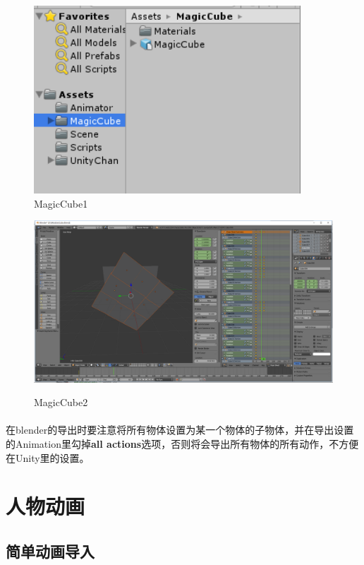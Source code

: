 \documentclass{article}
\begin{document}
\begin{figure}[H]
  \centering
  \includegraphics[width=10cm]{assets2.png}\\
  \caption{MagicCube1}\label{1-2}
  \includegraphics[width=36em]{blender1.png}\\
  \caption{MagicCube2}\label{1-3}
\end{figure}
\paragraph{}
在blender的导出时要注意将所有物体设置为某一个物体的子物体，并在导出设置的Animation里勾掉\textbf{all actions}选项，否则将会导出所有物体的所有动作，不方便在Unity里的设置。
\section{人物动画}
\subsection{简单动画导入}
\end{document}

